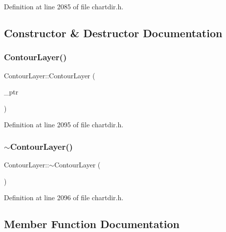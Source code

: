 Definition at line 2085 of file chartdir.\+h.



\subsection{Constructor \& Destructor Documentation}
\mbox{\label{class_contour_layer_a5f7d9b41aefd4c3915b7167c11c4eb47}} 
\subsubsection{\texorpdfstring{Contour\+Layer()}{ContourLayer()}}
{\footnotesize\ttfamily Contour\+Layer\+::\+Contour\+Layer (\begin{DoxyParamCaption}\item[{Contour\+Layer\+Internal $\ast$}]{\+\_\+ptr }\end{DoxyParamCaption})\hspace{0.3cm}{\ttfamily [inline]}}



Definition at line 2095 of file chartdir.\+h.

\mbox{\label{class_contour_layer_a4eb428d8bf191deb9682316a31981a9c}} 
\subsubsection{\texorpdfstring{$\sim$\+Contour\+Layer()}{~ContourLayer()}}
{\footnotesize\ttfamily Contour\+Layer\+::$\sim$\+Contour\+Layer (\begin{DoxyParamCaption}{ }\end{DoxyParamCaption})\hspace{0.3cm}{\ttfamily [inline]}}



Definition at line 2096 of file chartdir.\+h.



\subsection{Member Function Documentation}
\mbox{\label{class_contour_layer_a0556505096c28150c6ba6768cfaee356}} 
